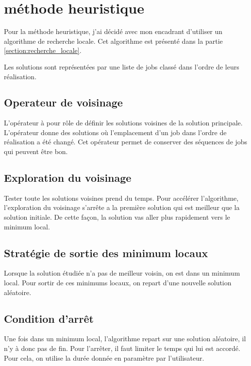 

\section{méthode heuristique}
\label{section:analyse:methode_heuristique}

Pour la méthode heuristique, j'ai décidé avec mon encadrant d'utiliser un algorithme de recherche locale.
Cet algorithme est présenté dans la partie \autoref{section:recherche_locale}.
	
Les solutions sont représentées par une liste de jobs classé dans l'ordre de leurs réalisation.

\subsection{Operateur de voisinage}

L'opérateur à pour rôle de définir les solutions voisines de la solution principale.
L'opérateur donne des solutions où l'emplacement d'un job dans l'ordre de réalisation a été changé.
Cet opérateur permet de conserver des séquences de jobs qui peuvent être bon.

\subsection{Exploration du voisinage}

Tester toute les solutions voisines prend du temps.
Pour accélérer l'algorithme, l'exploration du voisinage s'arrête a la première solution qui est meilleur que la solution initiale.
De cette façon, la solution vas aller plus rapidement vers le minimum local.

\subsection{Stratégie de sortie des minimum locaux}
Lorsque la solution étudiée n'a pas de meilleur voisin, on est dans un minimum local.
Pour sortir de ces minimums locaux, on repart d'une nouvelle solution aléatoire.

\subsection{Condition d'arrêt}
Une fois dans un minimum local, l'algorithme repart sur une solution aléatoire, il n'y à donc pas de fin.
Pour l'arrêter, il faut limiter le temps qui lui est accordé.
Pour cela, on utilise la durée donnée en paramètre par l'utilisateur.
